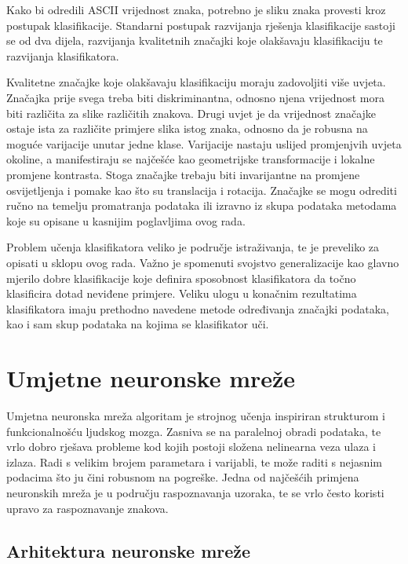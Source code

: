 \documentclass[lmodern, utf8, diplomski, numeric]{fer}
\begin{document}
Kako bi odredili ASCII vrijednost znaka, potrebno je sliku znaka provesti kroz postupak klasifikacije. Standarni postupak razvijanja rješenja klasifikacije sastoji se od dva dijela, razvijanja kvalitetnih značajki koje olakšavaju klasifikaciju te razvijanja klasifikatora. 

Kvalitetne značajke koje olakšavaju klasifikaciju moraju zadovoljiti više uvjeta. Značajka prije svega treba biti diskriminantna, odnosno njena vrijednost mora biti različita za slike različitih znakova. Drugi uvjet je da vrijednost značajke ostaje ista za različite primjere slika istog znaka, odnosno da je robusna na moguće varijacije unutar jedne klase. Varijacije nastaju uslijed promjenjvih uvjeta okoline, a manifestiraju se najčešće kao geometrijske transformacije i lokalne promjene kontrasta. Stoga značajke trebaju biti invarijantne na promjene osvijetljenja i pomake kao što su translacija i rotacija. Značajke se mogu odrediti ručno na temelju promatranja podataka ili izravno iz skupa podataka metodama koje su opisane u kasnijim poglavljima ovog rada.

Problem učenja klasifikatora veliko je područje istraživanja, te je preveliko za opisati u sklopu ovog rada. Važno je spomenuti svojstvo generalizacije kao glavno mjerilo dobre klasifikacije koje definira sposobnost klasifikatora da točno klasificira dotad neviđene primjere. Veliku ulogu u konačnim rezultatima klasifikatora imaju prethodno navedene metode određivanja značajki podataka, kao i sam skup podataka na kojima se klasifikator uči.


  

\chapter{Umjetne neuronske mreže}

Umjetna neuronska mreža  algoritam je strojnog učenja inspiriran strukturom i funkcionalnošću ljudskog mozga. Zasniva se na paralelnoj obradi podataka, te vrlo dobro rješava probleme kod kojih postoji složena nelinearna veza ulaza i izlaza. Radi s velikim brojem parametara i varijabli, te može raditi s nejasnim podacima što ju čini robusnom na pogreške. Jedna od najčešćih primjena neuronskih mreža je u području raspoznavanja uzoraka, te se vrlo često koristi upravo za raspoznavanje znakova.

 

\section{Arhitektura neuronske mreže}
\end{document}
